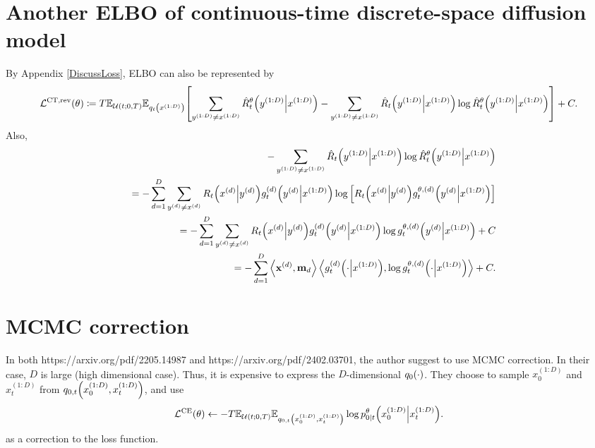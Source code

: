 \documentclass[10pt]{article}
\begin{document}
\section{Another ELBO of continuous-time discrete-space diffusion model}
By Appendix \ref{DiscussLoss}, ELBO can also be represented by
\begin{eqnarray*}
  \mathcal{L}^\text{CT,rev}(\theta)\coloneq T\mathbb{E}_{\mathcal{U}(t;0,T)}\mathbb{E}_{q_t\qty(x^{(1:D)})}\qty[\sum_{y^{(1:D)}\neq x^{(1:D)}}\hat{R}_t^\theta\qty(y^{(1:D)}\middle|x^{(1:D)}) - \sum_{y^{(1:D)}\neq x^{(1:D)}}\hat{R}_t\qty(y^{(1:D)}\middle|x^{(1:D)})\log\hat{R}_t^\theta\qty(y^{(1:D)}\middle|x^{(1:D)})] + C.
\end{eqnarray*}
Also,
\begin{eqnarray*}
  && - \sum_{y^{(1:D)}\neq x^{(1:D)}}\hat{R}_t\qty(y^{(1:D)}\middle|x^{(1:D)})\log\hat{R}_t^\theta\qty(y^{(1:D)}\middle|x^{(1:D)}) \\
  && = - \sum_{d=1}^D\sum_{y^{(d)}\neq x^{(d)}}R_t\qty(x^{(d)}\middle|y^{(d)})g_t^{(d)}\qty(y^{(d)}\middle|x^{(1:D)})\log\qty[R_t\qty(x^{(d)}\middle|y^{(d)})g_t^{\theta, (d)}\qty(y^{(d)}\middle|x^{(1:D)})] \\
  && = - \sum_{d=1}^D\sum_{y^{(d)}\neq x^{(d)}}R_t\qty(x^{(d)}\middle|y^{(d)})g_t^{(d)}\qty(y^{(d)}\middle|x^{(1:D)})\log g_t^{\theta, (d)}\qty(y^{(d)}\middle|x^{(1:D)}) + C \\
  && = - \sum_{d=1}^D \left\langle\mathbf{x}^{(d)}, \mathbf{m}_d\right\rangle \left\langle g_t^{(d)}\qty(\cdot \middle|x^{(1:D)}), \log g_t^{\theta, (d)}\qty(\cdot \middle|x^{(1:D)}) \right\rangle + C.
\end{eqnarray*}

\section{MCMC correction}
In both https://arxiv.org/pdf/2205.14987 and https://arxiv.org/pdf/2402.03701, the author suggest to use MCMC correction. In their case, $D$ is large (high dimensional case). Thus, it is expensive to express the $D$-dimensional $q_0\qty(\cdot)$. They choose to sample $x^{(1:D)}_0$ and $x^{(1:D)}_t$ from $q_{0,t}\qty(x^{(1:D)}_0, x^{(1:D)}_t)$, and use
\begin{eqnarray*}
  \mathcal{L}^\text{CE}(\theta)\gets -T\mathbb{E}_{\mathcal{U}(t;0,T)}\mathbb{E}_{q_{0,t}\qty(x^{(1:D)}_0, x^{(1:D)}_t)}\log p^\theta_{0|t}\qty(x^{(1:D)}_0\middle|x^{(1:D)}_t).
\end{eqnarray*}
as a correction to the loss function.
\end{document}
